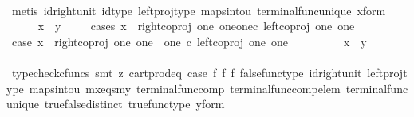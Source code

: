 \begin{isabellebody}
\ \ \ \ \ \ \isamarkupfalse%
\ {\isacharparenleft}{\kern0pt}metis\ id{\isacharunderscore}{\kern0pt}right{\isacharunderscore}{\kern0pt}unit{}\ id{\isacharunderscore}{\kern0pt}type\ left{\isacharunderscore}{\kern0pt}proj{\isacharunderscore}{\kern0pt}type\ maps{\isacharunderscore}{\kern0pt}into{\isacharunderscore}{\kern0pt}{}u{}\ terminal{\isacharunderscore}{\kern0pt}func{\isacharunderscore}{\kern0pt}unique\ x{\isacharunderscore}{\kern0pt}form{\isacharparenright}{\kern0pt}\isanewline
\ \ \ \ \isamarkupfalse%
\ {\isachardoublequoteopen}x\ {\isacharequal}{\kern0pt}\ y{\isachardoublequoteclose}\isanewline
\ \ \ \ \isamarkupfalse%
{\isacharparenleft}{\kern0pt}cases\ {\isachardoublequoteopen}x\ {\isacharequal}{\kern0pt}\ {\isacharparenleft}{\kern0pt}right{\isacharunderscore}{\kern0pt}coproj\ one\ {\isacharparenleft}{\kern0pt}one{\isasymCoprod}one{\isacharparenright}{\kern0pt}{\isasymcirc}\isactrlsub c\ left{\isacharunderscore}{\kern0pt}coproj\ one\ one{\isacharparenright}{\kern0pt}{\isachardoublequoteclose}{\isacharparenright}{\kern0pt}\isanewline
\ \ \ \ \ \ \isamarkupfalse%
\ case{}{\isacharcolon}{\kern0pt}\ {\isachardoublequoteopen}x\ {\isacharequal}{\kern0pt}\ right{\isacharunderscore}{\kern0pt}coproj\ one\ {\isacharparenleft}{\kern0pt}one\ {\isasymCoprod}\ one{\isacharparenright}{\kern0pt}\ {\isasymcirc}\isactrlsub c\ left{\isacharunderscore}{\kern0pt}coproj\ one\ one{\isachardoublequoteclose}\isanewline
\ \ \ \ \ \ \isamarkupfalse%
\ \isamarkupfalse%
\ {\isachardoublequoteopen}x\ {\isacharequal}{\kern0pt}\ y{\isachardoublequoteclose}\isanewline
\ \ \ \ \ \ \ \ \isamarkupfalse%
\ {\isacharparenleft}{\kern0pt}typecheck{\isacharunderscore}{\kern0pt}cfuncs{\isacharcomma}{\kern0pt}\ smt\ {\isacharparenleft}{\kern0pt}z{}{\isacharparenright}{\kern0pt}\ cart{\isacharunderscore}{\kern0pt}prod{\isacharunderscore}{\kern0pt}eq{}\ case{}\ f{}\ f{}\ f{}\ false{\isacharunderscore}{\kern0pt}func{\isacharunderscore}{\kern0pt}type\ id{\isacharunderscore}{\kern0pt}right{\isacharunderscore}{\kern0pt}unit{}\ left{\isacharunderscore}{\kern0pt}proj{\isacharunderscore}{\kern0pt}type\ maps{\isacharunderscore}{\kern0pt}into{\isacharunderscore}{\kern0pt}{}u{}\ mx{\isacharunderscore}{\kern0pt}eqs{\isacharunderscore}{\kern0pt}my\ terminal{\isacharunderscore}{\kern0pt}func{\isacharunderscore}{\kern0pt}comp\ terminal{\isacharunderscore}{\kern0pt}func{\isacharunderscore}{\kern0pt}comp{\isacharunderscore}{\kern0pt}elem\ terminal{\isacharunderscore}{\kern0pt}func{\isacharunderscore}{\kern0pt}unique\ true{\isacharunderscore}{\kern0pt}false{\isacharunderscore}{\kern0pt}distinct\ true{\isacharunderscore}{\kern0pt}func{\isacharunderscore}{\kern0pt}type\ y{\isacharunderscore}{\kern0pt}form{\isacharparenright}{\kern0pt}\ \ \ \ \ \ \ \ \isanewline

\end{isabellebody}
